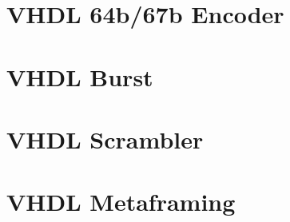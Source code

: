 \section{VHDL 64b/67b Encoder}

\newpage

\section{VHDL Burst}

\newpage

\section{VHDL Scrambler}
\label{Appendix:Scrambler}

\newpage

\section{VHDL Metaframing}

\newpage